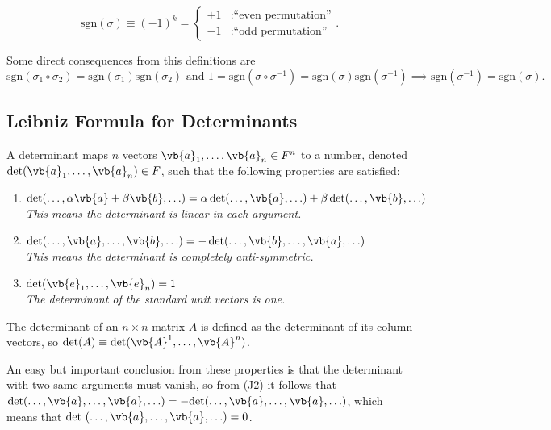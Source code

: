 \documentclass[a4paper,12pt]{report}
\begin{document}
\begin{equation}
    \text{sgn}(\sigma ) \equiv (-1)^{k} = 
    \begin{cases}
        +1 &: \text{``even permutation''} \\
        -1 &: \text{``odd permutation''}
    \end{cases}.  
\end{equation}

Some direct consequences from this definitions are \(\text{sgn}(\sigma _{1} \circ \sigma _{2}  ) = \text{sgn}(\sigma _{1} ) \text{sgn}(\sigma _{2} ) \text { and } 1 = \text{sgn}(\sigma \circ \sigma ^{-1} ) = \text{sgn}(\sigma )\text{sgn}(\sigma ^{-1} ) \implies \text{sgn}(\sigma ^{-1} ) = \text{sgn}(\sigma ).        \) 

\subsection{Leibniz Formula for Determinants}

\begin{definition}
    A determinant maps \( n \) vectors \(\vb{a}_1, \ldots, \vb{a}_n \in F^n\) to a number, denoted \(\det(\vb{a}_1, \ldots, \vb{a}_n) \in F\), such that the following properties are satisfied:
    \begin{enumerate}[label=(\(J\)\arabic*)]
        \item \(\det(\ldots, \alpha \vb{a} + \beta \vb{b}, \ldots) = \alpha \det(\ldots, \vb{a}, \ldots) + \beta \det(\ldots, \vb{b}, \ldots)\)\\
        \textit{This means the determinant is linear in each argument.}
        
        \item \(\det(\ldots, \vb{a}, \ldots, \vb{b}, \ldots) = -\det(\ldots, \vb{b}, \ldots, \vb{a}, \ldots)\)\\
        \textit{This means the determinant is completely anti-symmetric.}
        
        \item \(\det(\vb{e}_1, \ldots, \vb{e}_n) = 1\)\\
        \textit{The determinant of the standard unit vectors is one.}
    \end{enumerate}
    The determinant of an \( n \times n \) matrix \( A \) is defined as the determinant of its column vectors, so \(\det(A) \equiv  \det(\vb{A}^1, \ldots, \vb{A}^n)\).
\end{definition}

An easy but important conclusion from these properties is that the determinant with two same arguments must vanish, so from (J2) it follows that \(\text{det}(\ldots , \vb{a} , \ldots , \vb{a} , \ldots ) = - \text{det}(\ldots ,\vb{a} ,\ldots ,\vb{a} ,\ldots )  \), which means that \(\text{det }(\ldots , \vb{a} ,\ldots ,\vb{a} ,\ldots ) = 0  \). 
\end{document}

